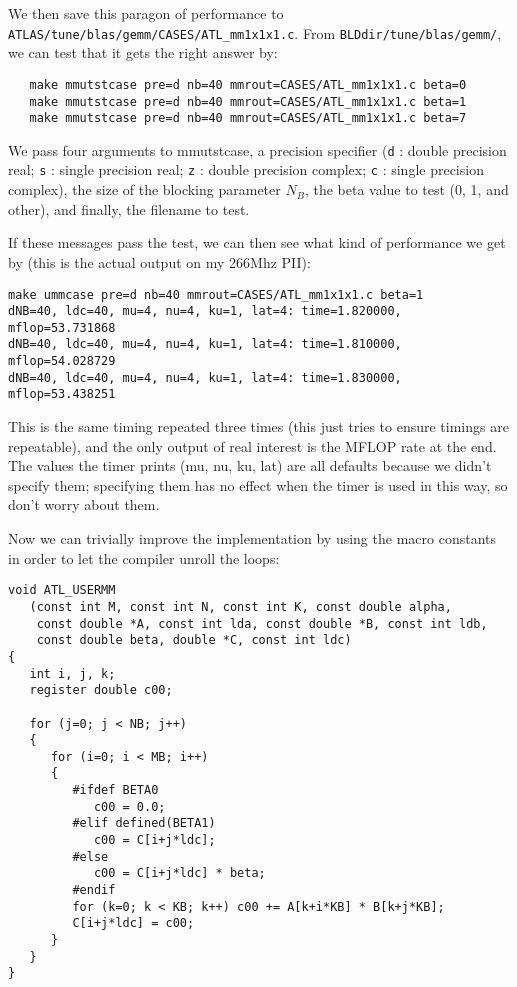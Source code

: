 \documentclass[11pt]{article}
\begin{document}
We then save this paragon of performance to 
{\tt ATLAS/tune/blas/gemm/CASES/ATL\_mm1x1x1.c}.  
From {\tt BLDdir/tune/blas/gemm/}, we can test that it
gets the right answer by:
\begin{verbatim}
   make mmutstcase pre=d nb=40 mmrout=CASES/ATL_mm1x1x1.c beta=0
   make mmutstcase pre=d nb=40 mmrout=CASES/ATL_mm1x1x1.c beta=1
   make mmutstcase pre=d nb=40 mmrout=CASES/ATL_mm1x1x1.c beta=7
\end{verbatim}

We pass four arguments to mmutstcase, a precision specifier
({\tt d} : double precision real; {\tt s} : single precision real; 
 {\tt z} : double precision complex; {\tt c} : single precision complex),
the size of the blocking parameter $N_B$, the beta value to test
(0, 1, and other), and finally, the filename to test.

If these messages pass the test, we can then see what kind of performance
we get by (this is the actual output on my 266Mhz PII):
\begin{verbatim}
make ummcase pre=d nb=40 mmrout=CASES/ATL_mm1x1x1.c beta=1
dNB=40, ldc=40, mu=4, nu=4, ku=1, lat=4: time=1.820000, mflop=53.731868
dNB=40, ldc=40, mu=4, nu=4, ku=1, lat=4: time=1.810000, mflop=54.028729
dNB=40, ldc=40, mu=4, nu=4, ku=1, lat=4: time=1.830000, mflop=53.438251
\end{verbatim}

This is the same timing repeated three times (this just tries to ensure
timings are repeatable), and the only output of real interest is the
MFLOP rate at the end.  The values the timer prints (mu, nu, ku, lat) are
all defaults because we didn't specify them; specifying them has no
effect when the timer is used in this way, so don't worry about them.

Now we can trivially improve the implementation by using the macro
constants in order to let the compiler unroll the loops:
\begin{verbatim}
void ATL_USERMM
   (const int M, const int N, const int K, const double alpha,
    const double *A, const int lda, const double *B, const int ldb,
    const double beta, double *C, const int ldc)
{
   int i, j, k;
   register double c00;

   for (j=0; j < NB; j++)
   {
      for (i=0; i < MB; i++)
      {
         #ifdef BETA0
            c00 = 0.0;
         #elif defined(BETA1)
            c00 = C[i+j*ldc];
         #else
            c00 = C[i+j*ldc] * beta;
         #endif
         for (k=0; k < KB; k++) c00 += A[k+i*KB] * B[k+j*KB];
         C[i+j*ldc] = c00;
      }
   }
}
\end{verbatim}
\end{document}
